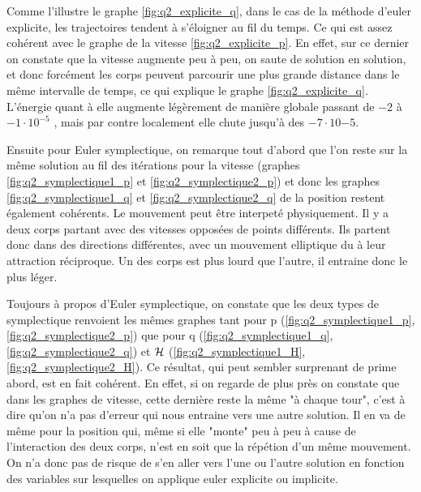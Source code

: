 	Comme l'illustre le graphe \ref{fig:q2_explicite_q}, dans le cas de la méthode d'euler explicite, les trajectoires tendent à s'éloigner au fil du temps. Ce qui est assez cohérent avec le graphe de la vitesse \ref{fig:q2_explicite_p}. En effet, sur ce dernier on constate que la vitesse augmente peu à peu, on saute de solution en solution, et donc forcément les corps peuvent parcourir une plus grande distance dans le même intervalle de temps, ce qui explique le graphe \ref{fig:q2_explicite_q}. L'énergie quant à elle augmente légèrement de manière globale  passant de $-2$ à $-1 \cdot 10^{-5}$ , mais par contre localement elle chute jusqu'à des $-7 \cdot 10{-5}$. 
	
	
	Ensuite pour Euler symplectique, on remarque tout d'abord que l'on reste sur la même solution au fil des itérations pour la vitesse (graphes \ref{fig:q2_symplectique1_p} et \ref{fig:q2_symplectique2_p}) et donc les graphes \ref{fig:q2_symplectique1_q} et \ref{fig:q2_symplectique2_q} de la position restent également cohérents. Le mouvement peut être interpeté physiquement. Il y a deux corps partant avec des vitesses opposées de points différents. Ils partent donc dans des directions différentes, avec un mouvement elliptique du à leur attraction réciproque. Un des corps est plus lourd que l'autre, il entraine donc le plus léger.   
	
	Toujours à propos d'Euler symplectique, on constate que les deux types de symplectique renvoient les mêmes graphes tant pour p (\ref{fig:q2_symplectique1_p}, \ref{fig:q2_symplectique2_p}) que pour q (\ref{fig:q2_symplectique1_q}, \ref{fig:q2_symplectique2_q})  et $\mathcal{H}$ (\ref{fig:q2_symplectique1_H}, \ref{fig:q2_symplectique2_H}). Ce résultat, qui peut sembler surprenant de prime abord, est en fait cohérent. En effet, si on regarde de plus près on constate que dans les graphes de vitesse, cette dernière reste la même "à chaque tour", c'est à dire qu'on n'a pas d'erreur qui nous entraine vers une autre solution. Il en va de même pour la position qui, même si elle "monte" peu à peu à cause de l'interaction des deux corps, n'est en soit que la répétion d'un même mouvement. On n'a donc pas de risque de s'en aller vers l'une ou l'autre solution en fonction des variables sur lesquelles on applique euler explicite ou implicite.    

	


